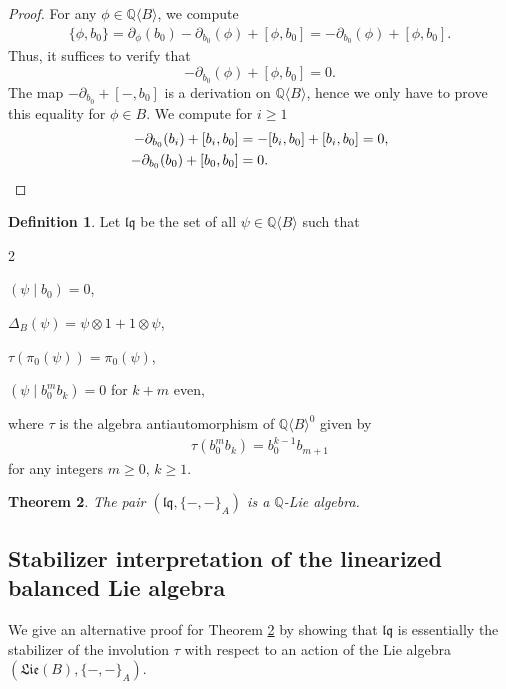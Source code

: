 \documentclass[11pt, a4paper]{amsart}
\newtheorem{theorem}{Theorem}[section]
\numberwithin{equation}{section}
\theoremstyle{definition}
\newtheorem{definition}[theorem]{Definition}
\newcommand{\Q}{\mathbb{Q}}
\newcommand{\QB}{\Q\langle B\rangle}
\newcommand{\lqq}{\mathfrak{lq}}
\newcommand{\Lie}{\mathfrak{Lie}}
\begin{document}
\begin{proof} For any $\phi\in\QB$, we compute
\begin{align*}
\{\phi,b_0\}=\partial_\phi(b_0)-\partial_{b_0}(\phi)+[\phi,b_0]=-\partial_{b_0}(\phi)+[\phi,b_0].
\end{align*}
Thus, it suffices to verify that
\[-\partial_{b_0}(\phi)+[\phi,b_0]=0.\]
The map $-\partial_{b_0}+[-,b_0]$ is a derivation on $\QB$, hence we only have to prove this equality for $\phi \in B$. We compute for $i\geq 1$
\begin{align*}
-\partial_{b_0}(b_i)+[b_i,b_0]&=-[b_i,b_0]+[b_i,b_0]=0, \\
-\partial_{b_0}(b_0)+[b_0,b_0]&=0.
\qedhere\end{align*}
\end{proof}

\begin{definition} \label{def:lq}
Let $\lqq$ be the set of all $\psi\in \QB$ such that
\begin{enumerate}[label=(\roman*), leftmargin=*, itemsep=5pt]
\begin{multicols}{2}
\item $(\psi\mid b_0)=0$,
\item $\Delta_B(\psi)=\psi\otimes1+1\otimes\psi$,
\item $\tau(\pi_0(\psi))=\pi_0(\psi)$,
\item $(\psi\mid b_0^mb_k)=0$ for $k+m$ even,
\end{multicols}
\end{enumerate}
where $\tau$ is the algebra antiautomorphism of $\QB^0$ given by
\begin{align*} %
\tau(b_0^mb_k)=b_0^{k-1}b_{m+1}
\end{align*}
for any integers $m\geq0$, $k\geq1$.
\end{definition}


\begin{theorem} \label{thm:lq_Lie} \cite[Theorem 4.3]{Bu25}
The pair $(\lqq,\{-,-\}_A)$ is a $\Q$-Lie algebra.
\end{theorem}


\subsection{Stabilizer interpretation of the linearized balanced Lie algebra}
We give an alternative proof for Theorem \ref{thm:lq_Lie} by showing that $\lqq$ is essentially the stabilizer of the involution $\tau$ with respect to an action of the Lie algebra $(\Lie(B),\{-,-\}_A)$.
\end{document}
